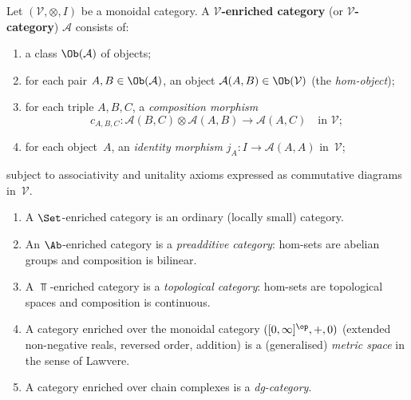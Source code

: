 \begin{definition}\label{def:enriched-cat}
Let $(\mathcal{V}, \otimes, I)$ be a monoidal category.
A \textbf{$\mathcal{V}$-enriched category} (or \textbf{$\mathcal{V}$-category})
$\mathcal{A}$ consists of:
\begin{enumerate}[label=(\roman*)]
\item a class $\Ob(\mathcal{A})$ of objects;
\item for each pair $A,B\in\Ob(\mathcal{A})$, an object
      $\mathcal{A}(A,B)\in\Ob(\mathcal{V})$ (the \emph{hom-object});
\item for each triple $A,B,C$, a \emph{composition morphism}
      \[
          c_{A,B,C}\colon \mathcal{A}(B,C)\otimes\mathcal{A}(A,B)
          \longrightarrow \mathcal{A}(A,C) \quad\text{in }\mathcal{V};
      \]
\item for each object~$A$, an \emph{identity morphism}
      $j_A\colon I\to\mathcal{A}(A,A)$ in~$\mathcal{V}$;
\end{enumerate}
subject to associativity and unitality axioms expressed as commutative
diagrams in~$\mathcal{V}$.
\end{definition}

\begin{example}\label{ex:enriched-examples}
\begin{enumerate}[label=(\roman*)]
\item A $\Set$-enriched category is an ordinary (locally small) category.
\item An $\Ab$-enriched category is a \emph{preadditive category}:
      hom-sets are abelian groups and composition is bilinear.
\item A $\Top$-enriched category is a \emph{topological category}:
      hom-sets are topological spaces and composition is continuous.
\item A category enriched over the monoidal category $([0,\infty]^{\op}, +, 0)$
      (extended non-negative reals, reversed order, addition) is a
      (generalised) \emph{metric space} in the sense of Lawvere.
\item A category enriched over chain complexes is a \emph{dg-category}.
\end{enumerate}
\end{example}

